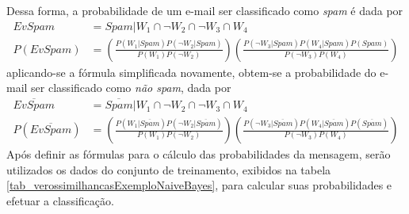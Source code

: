 Dessa forma, a probabilidade de um e-mail ser classificado como \emph{spam} é dada por
{\footnotesize
\begin{align}
EvSpam &= Spam|W_{1} \cap \neg W_{2} \cap \neg W_{3} \cap W_{4} \label{ProbabilidadeSpamBayesResumo}\\
P(EvSpam) &= \left(\frac{P(W_{1}|Spam) P(\neg W_{2}|Spam) }{P(W_{1}) P(\neg W_{2})}\right)\left(\frac{P(\neg W_{3}|Spam) P(W_{4}|Spam) P(Spam)}{P(\neg W_{3}) P(W_{4})} \right) \label{ProbabilidadeSpamBayes}
\end{align}
}
aplicando-se a fórmula simplificada novamente, obtem-se a probabilidade do e-mail ser classificado como \emph{não spam}, dada por
{\footnotesize
\begin{align}
\overline{EvSpam} &= \overline{Spam}|W_{1} \cap \neg W_{2} \cap \neg W_{3} \cap W_{4} \\
P(\overline{EvSpam}) &= \left( \frac{P(W_{1}|\overline{Spam}) P(\neg W_{2}|\overline{Spam}) }{P(W_{1}) P(\neg W_{2})}\right) \left(\frac{P(\neg W_{3}|\overline{Spam}) P(W_{4}|\overline{Spam}) P(\overline{Spam})}{P(\neg W_{3}) P(W_{4})}\right) \label{ProbabilidadeNaoSpamBayes}
\end{align}
}
Após definir as fórmulas para o cálculo das probabilidades da mensagem, serão utilizados os dados do conjunto de treinamento, exibidos na tabela \ref{tab_verossimilhancasExemploNaiveBayes}, para calcular suas probabilidades e efetuar a classificação.
\bgroup
\def\arraystretch{1.5}
